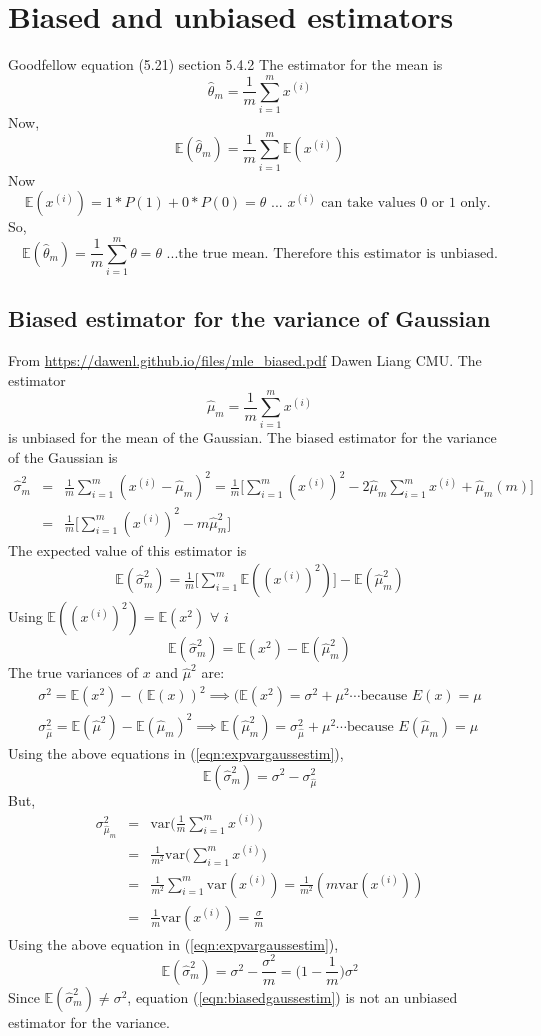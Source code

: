 \documentclass{article}
\newcommand{\beq}{\begin{equation}}
\newcommand{\eeq}{\end{equation}}
\newcommand{\ber}{\begin{eqnarray}}
\newcommand{\eer}{\end{eqnarray}}
\begin{document}
\section{Biased and unbiased estimators}
Goodfellow equation (5.21) section 5.4.2
The estimator for the mean is
\beq
\hat{\theta}_m = \frac{1}{m}\sum_{i=1}^{m}x^{(i)}
\eeq
Now,
\beq
\mathbb{E}(\hat{\theta}_m) = \frac{1}{m}\sum_{i=1}^{m}\mathbb{E}(x^{(i)})
\eeq
Now
\beq
\mathbb{E}(x^{(i)}) = 1*P(1) + 0*P(0) = \theta \text{ ... } x^{(i)} \text{ can take values 0 or 1 only. }
\eeq
So,
\beq
\mathbb{E}(\hat{\theta}_m) = \frac{1}{m}\sum_{i=1}^{m}\theta = \theta \text{ ...the true mean. Therefore this estimator is unbiased.}  
\eeq
\subsection{Biased estimator for the variance of Gaussian}
From \url{https://dawenl.github.io/files/mle_biased.pdf} Dawen Liang CMU.
The estimator
\beq
\hat{\mu}_{m} = \frac{1}{m}\sum_{i=1}^{m} x^{(i)}
\eeq
is unbiased for the mean of the Gaussian. The biased estimator for the variance of the Gaussian is
\ber
\hat{\sigma}^2_m &=& \frac{1}{m}\sum_{i=1}^{m}(x^{(i)}-\hat{\mu}_m)^2 = \frac{1}{m}\Big[\sum_{i=1}^{m}(x^{(i)})^2 - 2\hat{\mu}_{m}\sum_{i=1}^{m}x^{(i)} + \hat{\mu}_m(m)\Big]\\
&=& \frac{1}{m}\Big[\sum_{i=1}^{m}(x^{(i)})^2 - m\hat{\mu}_m^2\Big] \label{eqn:biasedgaussestim}
\eer
The expected value of this estimator is
\ber
\mathbb{E}(\hat{\sigma}^2_m) = \frac{1}{m}\Big[\sum_{i=1}^{m}\mathbb{E}((x^{(i)})^2)\Big]-\mathbb{E}(\hat{\mu}_m^2)
\eer
Using $\mathbb{E}((x^{(i)})^2)=\mathbb{E}(x^2) \,\,\forall\,\,i$
\beq
\label{eqn:expvargaussestim}
\mathbb{E}(\hat{\sigma}^2_m) = \mathbb{E}(x^2) - \mathbb{E}(\hat{\mu}^2_m)
\eeq
The true variances of $x$ and $\hat{\mu}^2$ are:
\ber
\sigma^2 = \mathbb{E}(x^2) - (\mathbb{E}(x))^2 \implies (\mathbb{E}(x^2) = \sigma^2 + \mu^2 \cdots \text{because } E(x)=\mu\\
\sigma^2_{\hat{\mu}} = \mathbb{E}(\hat{\mu}^2) - \mathbb{E}(\hat{\mu}_m)^2 \implies \mathbb{E}(\hat{\mu}^2_m) =  \sigma^2_{\hat{\mu}} + \mu^2 \cdots \text{because } E(\hat{\mu}_m)=\mu
\eer
Using the above equations in (\ref{eqn:expvargaussestim}),
\beq
\label{eqn:expvargaussestim2}
\mathbb{E}(\hat{\sigma}^2_m)  = \sigma^2 - \sigma^2_{\hat{\mu}}
\eeq
But,
\ber
\sigma^2_{\hat{\mu}_m} &=& \text{var}\Big( \frac{1}{m}\sum_{i=1}^{m} x^{(i)}\Big) \\
&=& \frac{1}{m^2}\text{var}\Big(\sum_{i=1}^{m} x^{(i)}\Big) \\
&=& \frac{1}{m^2}\sum_{i=1}^{m}\text{var}(x^{(i)}) = \frac{1}{m^2}(m\text{var}(x^{(i)}))\\
&=&\frac{1}{m}\text{var}(x^{(i)})= \frac{\sigma}{m}
\eer
Using the above equation in (\ref{eqn:expvargaussestim}),
\beq
\mathbb{E}(\hat{\sigma}^2_m) = \sigma^2 - \frac{\sigma^2}{m} = \Big(1-\frac{1}{m}\Big)\sigma^2
\eeq
Since $\mathbb{E}(\hat{\sigma}^2_m)\ne \sigma^2$, equation (\ref{eqn:biasedgaussestim}) is not an unbiased estimator for the variance.
\end{document}

